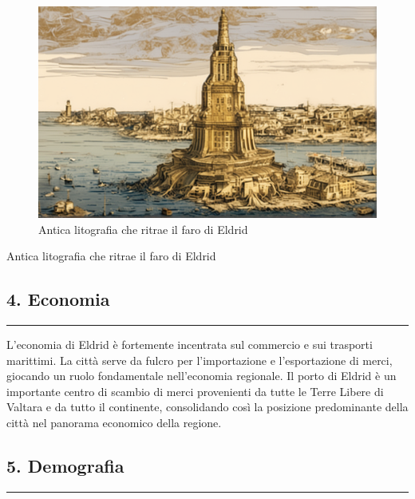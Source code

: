 \begin{figure}
\centering
\includegraphics{faro-haze-ultra-detailed-film-photography-light-leaks-larry-bud-melman-trending-on-artstation.png}
\caption{Antica litografia che ritrae il faro di Eldrid}
\end{figure}

Antica litografia che ritrae il faro di Eldrid

\subsection{4. Economia}\label{economia}

\begin{center}\rule{0.5\linewidth}{0.5pt}\end{center}

L'economia di Eldrid è fortemente incentrata sul commercio e sui
trasporti marittimi. La città serve da fulcro per l'importazione e
l'esportazione di merci, giocando un ruolo fondamentale nell'economia
regionale. Il porto di Eldrid è un importante centro di scambio di merci
provenienti da tutte le Terre Libere di Valtara e da tutto il
continente, consolidando così la posizione predominante della città nel
panorama economico della regione.

\subsection{5. Demografia}\label{demografia}

\begin{center}\rule{0.5\linewidth}{0.5pt}\end{center}

